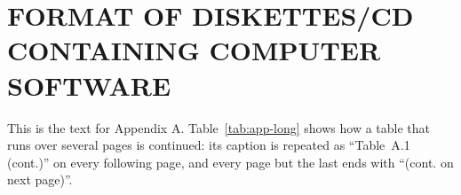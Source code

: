 %
%

\chapter{FORMAT OF DISKETTES/CD CONTAINING COMPUTER SOFTWARE}
\label{app:software}

This is the text for Appendix A. Table~\ref{tab:app-long} shows how a table that runs over several pages is continued: its caption is repeated as ``Table~A.1 (cont.)'' on every following page, and every page but the last ends with ``(cont. on next page)''.

